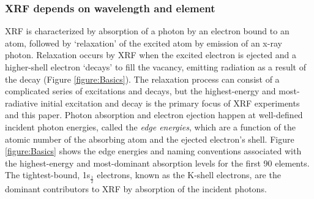 \documentclass[%
  aip,12pt,tightenlines,
  amsthm,
 amsmath,amssymb,
 reprint,%
]{revtex4-1}
\newcommand{\fRef}[1]{Figure \ref{figure:#1}}
\newcommand{\fLabel}[1]{\label{figure:#1}}
\newcommand{\sLabel}[1]{\label{section:#1}}
\newcommand{\pcaption}[1]{\caption{\noindent#1}}
\newcommand{\firstp}[0]{\noindent}
\newcommand{\pEndF}[0]{ \\ }
\newcommand{\pStartF}[0]{ }
\begin{document}

\subsubsection{\sLabel{Beer}XRF depends on wavelength and element}

\firstp XRF is characterized by absorption of a photon by an electron bound to an atom, followed by `relaxation' of the excited atom by emission of an x-ray photon.\cite{jitschin_progress_1990} Relaxation occurs by XRF when the excited electron is ejected and a higher-shell electron `decays' to fill the vacancy, emitting radiation as a result of the decay (\fRef{Basics}). The relaxation process can consist of a complicated series of excitations and decays,\cite{santra_concepts_2009} but the highest-energy and most-radiative initial excitation and decay is the primary focus of XRF experiments and this paper. Photon absorption and electron ejection happen at well-defined incident photon energies, called the \emph{edge energies}, which are a function of the atomic number of the absorbing atom and the ejected electron's shell.\cite{ueda_high-resolution_2003,de_groot_high-resolution_2001} \fRef{Basics} shows the edge energies and naming conventions associated with the highest-energy and most-dominant\cite{chantler_detailed_2000} absorption levels for the first 90 elements. The tightest-bound, 1s$_{\frac{1}{2}}$ electrons, known as the K-shell electrons, are the dominant contributors to XRF by absorption of the incident photons.\cite{chantler_detailed_2000}
\end{document}
